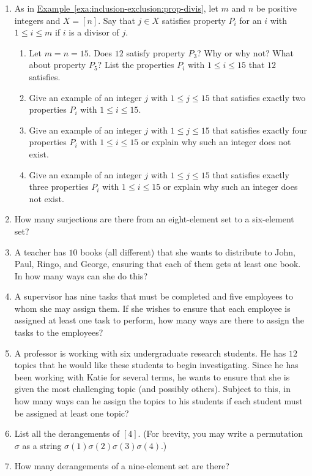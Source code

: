 \begin{enumerate}
\item As in
  \hyperref[exa:inclusion-exclusion:prop-divis]{Example~\ref*{exa:inclusion-exclusion:prop-divis}},
  let $m$ and $n$ be positive integers and $X=[n]$. Say that $j\in X$
  satisfies property $P_i$ for an $i$ with $1\leq i\leq m$ if $i$ is a
  divisor of $j$.
  \begin{enumerate}
  \item Let $m=n=15$. Does $12$ satisfy property $P_3$? Why or why
    not? What about property $P_5$? List the properties $P_i$ with
    $1\leq i\leq 15$ that $12$ satisfies.
  \item Give an example of an integer $j$ with $1\leq j\leq 15$ that
    satisfies exactly two properties $P_i$ with $1\leq i\leq 15$.
  \item Give an example of an integer $j$ with $1\leq j\leq 15$ that
    satisfies exactly four properties $P_i$ with $1\leq i\leq 15$ or
    explain why such an integer does not exist.
  \item Give an example of an integer $j$ with $1\leq j\leq 15$ that
    satisfies exactly three properties $P_i$ with $1\leq i\leq 15$ or
    explain why such an integer does not exist.
  \end{enumerate}
\item How many surjections are there from an eight-element set to a
  six-element set?
\item A teacher has $10$ books (all different) that she wants to
 distribute to John, Paul, Ringo, and George, ensuring that each of
 them gets at least one book. In how many ways can she do this?
\item A supervisor has nine tasks that must be completed and five
  employees to whom she may assign them. If she wishes to ensure that
  each employee is assigned at least one task to perform, how many
  ways are there to assign the tasks to the employees?
\item A professor is working with six undergraduate research
  students. He has $12$ topics that he would like these students to
  begin investigating. Since he has been working with Katie for
  several terms, he wants to ensure that she is given the most
  challenging topic (and possibly others). Subject to this, in how
  many ways can he assign the topics to his students if each student
  must be assigned at least one topic?
\item List all the derangements of $[4]$. (For brevity, you may write
  a permutation $\sigma$ as a string
  $\sigma(1)\sigma(2)\sigma(3)\sigma(4)$.)
\item How many derangements of a nine-element set are there?

\end{enumerate}
